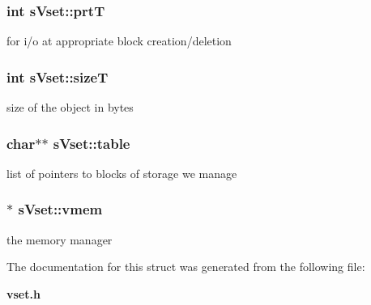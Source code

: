 \subsubsection[{prtT}]{\setlength{\rightskip}{0pt plus 5cm}int {\bf sVset::prtT}}\label{a00006_a8a9db3d22f89bd9b7ea2fdab710d885f}


for i/o at appropriate block creation/deletion 

\subsubsection[{sizeT}]{\setlength{\rightskip}{0pt plus 5cm}int {\bf sVset::sizeT}}\label{a00006_ab82de1c9f9c98179619094b92ffb4052}


size of the object in bytes 

\subsubsection[{table}]{\setlength{\rightskip}{0pt plus 5cm}char$\ast$$\ast$ {\bf sVset::table}}\label{a00006_a644cf781925192d072fa752cf2d08e13}


list of pointers to blocks of storage we manage 

\subsubsection[{vmem}]{$\ast$ {\bf sVset::vmem}}\label{a00006_a8af7fe493b077ad70164626b317e5d39}


the memory manager 



The documentation for this struct was generated from the following file:\begin{DoxyCompactItemize}
\item 
{\bf vset.h}\end{DoxyCompactItemize}
